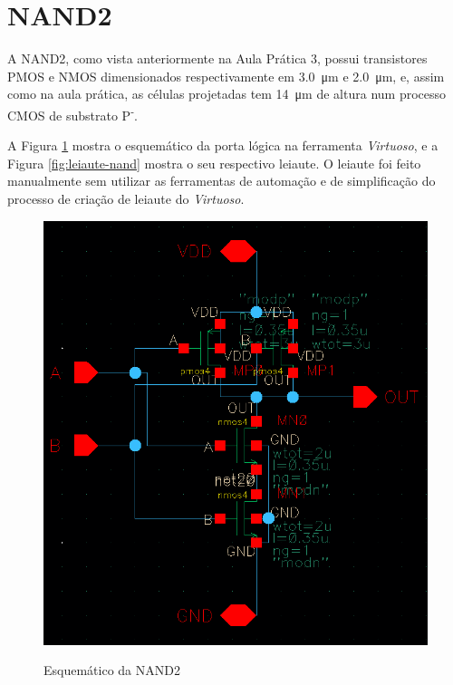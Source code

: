 \documentclass{iiufrgs}
\newcommand{\virtuoso}{\textit{Virtuoso}}
\begin{document}
\section{NAND2}\label{nand}
A NAND2, como vista anteriormente na Aula Prática 3, possui transistores PMOS e NMOS dimensionados respectivamente em \SI{3.0}{\um} e \SI{2.0}{\um}, e, assim como na aula prática, as células projetadas tem \SI{14}{\um} de altura num processo CMOS de substrato P\textsuperscript{-}.

A Figura \ref{fig:esquematico-nand} mostra o esquemático da porta lógica na ferramenta \virtuoso, e a Figura \ref{fig:leiaute-nand} mostra o seu respectivo leiaute. O leiaute foi feito manualmente sem utilizar as ferramentas de automação e de simplificação do processo de criação de leiaute do \virtuoso.

\begin{figure}[htbp]
    \centering
    \caption{Esquemático da NAND2}
    \includegraphics[scale=0.8]{images/new/schem_nand.png}
    \label{fig:esquematico-nand}
\end{figure}
\end{document}
